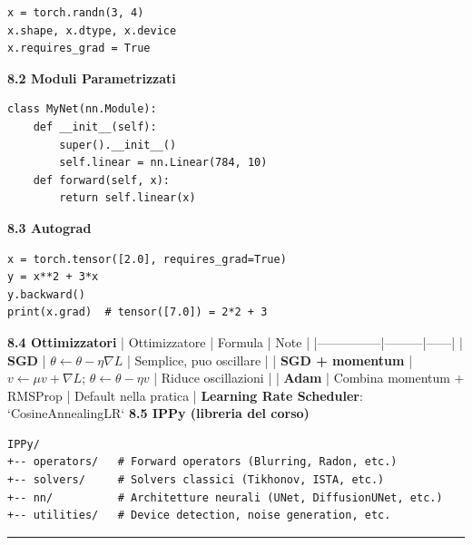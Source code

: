 \documentclass[italian,10pt]{beamer}
\begin{document}
\begin{lstlisting}[style=pp]
x = torch.randn(3, 4)
x.shape, x.dtype, x.device
x.requires_grad = True
\end{lstlisting}
\begin{frame}{}
\textbf{8.2 Moduli Parametrizzati}
\end{frame}

\begin{lstlisting}[style=pp]
class MyNet(nn.Module):
    def __init__(self):
        super().__init__()
        self.linear = nn.Linear(784, 10)
    def forward(self, x):
        return self.linear(x)
\end{lstlisting}
\begin{frame}{}
\textbf{8.3 Autograd}
\end{frame}

\begin{lstlisting}[style=pp]
x = torch.tensor([2.0], requires_grad=True)
y = x**2 + 3*x
y.backward()
print(x.grad)  # tensor([7.0]) = 2*2 + 3
\end{lstlisting}
\begin{frame}{}
\textbf{8.4 Ottimizzatori}
| Ottimizzatore | Formula | Note |
|---------------|---------|------|
| \textbf{SGD} | $\theta \leftarrow \theta - \eta \nabla L$ | Semplice, puo oscillare |
| \textbf{SGD + momentum} | $v \leftarrow \mu v + \nabla L$; $\theta \leftarrow \theta - \eta v$ | Riduce oscillazioni |
| \textbf{Adam} | Combina momentum + RMSProp | Default nella pratica |
\textbf{Learning Rate Scheduler}: `CosineAnnealingLR`
\textbf{8.5 IPPy (libreria del corso)}
\end{frame}

\begin{lstlisting}[style=pp]
IPPy/
+-- operators/   # Forward operators (Blurring, Radon, etc.)
+-- solvers/     # Solvers classici (Tikhonov, ISTA, etc.)
+-- nn/          # Architetture neurali (UNet, DiffusionUNet, etc.)
+-- utilities/   # Device detection, noise generation, etc.
\end{lstlisting}
\begin{frame}{}
\medskip\noindent\rule{\textwidth}{0.4pt}\medskip
\end{frame}
\end{document}
